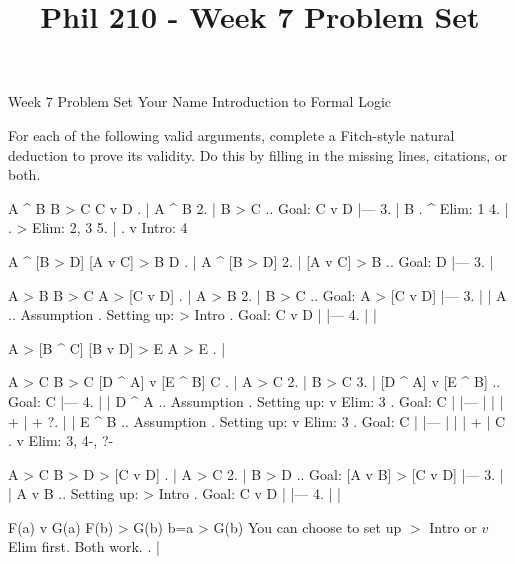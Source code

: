 
\title{Phil 210 - Week 7 Problem Set}

\heading
Week 7 Problem Set
Your Name
Introduction to Formal Logic
\endheading

For each of the following valid arguments, complete a Fitch-style natural deduction to prove its validity. Do this by filling in the missing lines, citations, or both.

\problems
{}
\argument
 A ^ B
 B > C
\argumentline
 C v D
\endargument
	\answer
	. | A ^ B
	 2. | B > C  ..  Goal: C v D
	    |---
	 3. | B      .  ^ Elim: 1
	 4. |        .  > Elim: 2, 3
	 5. |        .  v Intro: 4
	\endfitchproof
	\endanswer

\argument
 A ^ [B > D]
 [A v C] > B
\argumentline
 D
\endargument
	\answer
	. | A ^ [B > D]
	 2. | [A v C] > B  ..  Goal: D
	    |---
	 3. | 
	\endfitchproof
	\endanswer

\argument
 A > B
 B > C
\argumentline
 A > [C v D]
\endargument
	\answer
	. | A > B
	 2. | B > C        ..  Goal: A > [C v D]
	    |---
	 3. |   | A        ..  Assumption  .  Setting up: > Intro  .  Goal: C v D
	    |   |---
	 4. |   | 
	\endfitchproof
	\endanswer

\argument
 A > [B ^ C]
 [B v D] > E
\argumentline
 A > E
\endargument
	\answer
	. | 
	\endfitchproof
	\endanswer

\widerfitchsetup %
\argument
 A > C
 B > C
 [D ^ A] v [E ^ B]
\argumentline
 C
\endargument
	\answer
	. | A > C
	 2. | B > C
	 3. | [D ^ A] v [E ^ B]  ..  Goal: C
	    |---
	 4. |   | D ^ A  ..  Assumption  .  Setting up: v Elim: 3  .  Goal: C
	    |   |---
	    |   | 
	    |   +
	    |   +
	 ?. |   | E ^ B  ..  Assumption  .  Setting up: v Elim: 3  .  Goal: C
	    |   |---
	    |   | 
	    |   +
	    | C          .  v Elim: 3, 4-, ?-
	\endfitchproof
	\endanswer

\argument
 A > C
 B > D
\argumentline
 [A v B] > [C v D]
\endargument
	\answer
	. | A > C
	 2. | B > D          ..  Goal: [A v B] > [C v D]
	    |---
	 3. |   | A v B      ..  Setting up: > Intro    .  Goal: C v D
	    |   |---
	 4. |   | 
	\endfitchproof
	\endanswer

\argument
 F(a) v G(a)
 F(b) > G(b)
\argumentline
 b=a > G(b)
\endargument
\Hint You can choose to set up $>$ Intro or $v$ Elim first. Both work.
	\answer
	. | 
	\endfitchproof
	\endanswer

